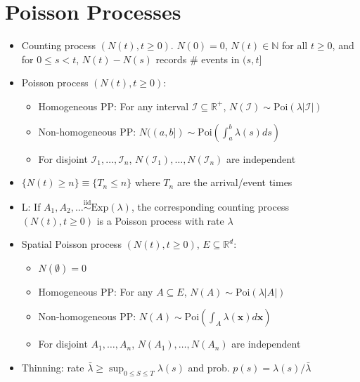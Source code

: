 \section{Poisson Processes}
\begin{itemize}
    \item Counting process $(N(t), t \geq 0)$. $N(0) = 0$, $N(t) \in \mathbb{N}$ for all $t \geq 0$, and for $0 \leq s < t$, $N(t) - N(s)$ records \# events in $(s, t]$
    \item Poisson process $(N(t), t \geq 0)$:
    \begin{itemize}
        \item Homogeneous PP: For any interval $\mathcal{I} \subseteq \mathbb{R}^+$, $N(\mathcal{I}) \sim \text{Poi}(\lambda|\mathcal{I}|)$
        \item Non-homogeneous PP: $N((a,b]) \sim \text{Poi}\left(\int_a^b \lambda(s) ds \right)$
        \item For disjoint $\mathcal{I}_1, \dots, \mathcal{I}_n$, $N(\mathcal{I}_1), \dots, N(\mathcal{I}_n)$ are independent
    \end{itemize}
    \item $\{N(t) \geq n\} \equiv \{T_n \leq n\}$ where $T_n$ are the arrival/event times
    \item L: If $A_1, A_2, \dots \stackrel{\text{iid}}{\sim} \text{Exp}(\lambda)$, the corresponding counting process $(N(t), t \geq 0)$ is a Poisson process with rate $\lambda$
    \item Spatial Poisson process $(N(t), t \geq 0)$, $E \subseteq \mathbb{R}^d$:
    \begin{itemize}
        \item $N(\emptyset) = 0$
        \item Homogeneous PP: For any $A \subseteq E$, $N(A) \sim \text{Poi}(\lambda |A|)$
        \item Non-homogeneous PP: $N(A) \sim \text{Poi}\left(\int_A \lambda(\boldsymbol{x})d\boldsymbol{x}\right)$
        \item For disjoint $A_1, \dots, A_n$, $N(A_1), \dots, N(A_n)$ are independent
    \end{itemize}
    \item Thinning: rate $\bar{\lambda} \geq \sup_{0\leq S \leq T}\lambda(s)$ and prob. $p(s) = \lambda(s)/\bar{\lambda}$
\end{itemize}

